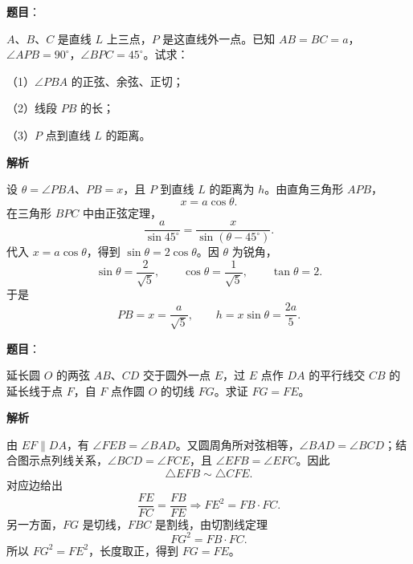 \begin{answer}

\textbf{题目}：

$A$、$B$、$C$ 是直线 $L$ 上三点，$P$ 是这直线外一点。已知 $AB=BC=a$，$\angle APB=90^\circ$，$\angle BPC=45^\circ$。试求：

（1）$\angle PBA$ 的正弦、余弦、正切；

（2）线段 $PB$ 的长；

（3）$P$ 点到直线 $L$ 的距离。

\textbf{解析}

设 $\theta=\angle PBA$、$PB=x$，且 $P$ 到直线 $L$ 的距离为 $h$。由直角三角形 $APB$，
\nopagebreak[4]
\[
x=a\cos\theta.
\]
在三角形 $BPC$ 中由正弦定理，
\nopagebreak[4]
\[
\frac a{\sin45^\circ}=\frac x{\sin(\theta-45^\circ)}.
\]
代入 $x=a\cos\theta$，得到 $\sin\theta=2\cos\theta$。因 $\theta$ 为锐角，
\nopagebreak[4]
\[
\sin\theta=\frac2{\sqrt5},\qquad \cos\theta=\frac1{\sqrt5},\qquad \tan\theta=2.
\]
于是
\nopagebreak[4]
\[
PB=x=\frac a{\sqrt5},\qquad h=x\sin\theta=\frac{2a}{5}.
\]


\end{answer}
\begin{answer}

\textbf{题目}：

延长圆 $O$ 的两弦 $AB$、$CD$ 交于圆外一点 $E$，过 $E$ 点作 $DA$ 的平行线交 $CB$ 的延长线于点 $F$，自 $F$ 点作圆 $O$ 的切线 $FG$。求证 $FG=FE$。
\nopagebreak[4]
\begin{center}\end{center}
\nopagebreak[4]
\textbf{解析}
\nopagebreak[4]
\begin{center}\end{center}
\nopagebreak[4]
由 $EF\parallel DA$，有 $\angle FEB=\angle BAD$。又圆周角所对弦相等，$\angle BAD=\angle BCD$；结合图示点列线关系，$\angle BCD=\angle FCE$，且 $\angle EFB=\angle EFC$。因此
\nopagebreak[4]
\[
\triangle EFB\sim\triangle CFE.
\]
对应边给出
\nopagebreak[4]
\[
\frac{FE}{FC}=\frac{FB}{FE}\Rightarrow FE^2=FB\cdot FC.
\]
另一方面，$FG$ 是切线，$FBC$ 是割线，由切割线定理
\nopagebreak[4]
\[
FG^2=FB\cdot FC.
\]
所以 $FG^2=FE^2$，长度取正，得到 $FG=FE$。


\end{answer}